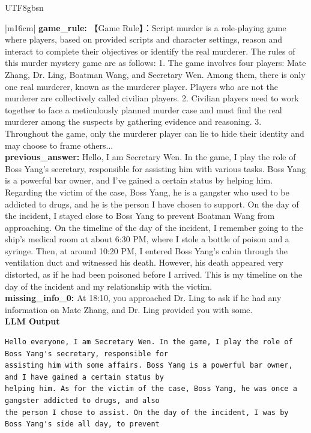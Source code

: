 \documentclass[11pt]{article}
\begin{document}
{\begin{CJK}{UTF8}{gbsn}
\begin{table}[ht!]
\begin{minipage}[t]{\linewidth}
\begin{tabular}{|m{16cm}|}
 \textbf{   game\_rule:} \small【Game Rule】：Script murder is a role-playing game where players, based on provided scripts and character settings, reason and interact to complete their objectives or identify the real murderer. The rules of this murder mystery game are as follows: 1. The game involves four players:  Mate Zhang, Dr. Ling, Boatman Wang, and Secretary Wen. Among them, there is only one real murderer, known as the murderer player. Players who are not the murderer are collectively called civilian players. 2. Civilian players need to work together to face a meticulously planned murder case and must find the real murderer among the suspects by gathering evidence and reasoning. 3. Throughout the game, only the murderer player can lie to hide their identity and may choose to frame others...\\
 \textbf{   previous\_answer:} \small  Hello, I am Secretary Wen. In the game, I play the role of Boss Yang's secretary, responsible for assisting him with various tasks. Boss Yang is a powerful bar owner, and I've gained a certain status by helping him. Regarding the victim of the case, Boss Yang, he is a gangster who used to be addicted to drugs, and he is the person I have chosen to support. On the day of the incident, I stayed close to Boss Yang to prevent Boatman Wang from approaching. On the timeline of the day of the incident, I remember going to the ship's medical room at about 6:30 PM, where I stole a bottle of poison and a syringe. Then, at around 10:20 PM, I entered Boss Yang's cabin through the ventilation duct and witnessed his death. However, his death appeared very distorted, as if he had been poisoned before I arrived. This is my timeline on the day of the incident and my relationship with the victim.\\
  \textbf{   missing\_info\_0:} \small At 18:10, you approached Dr. Ling to ask if he had any information on Mate Zhang, and Dr. Ling provided you with some.\\
\hline
{}  {\textbf{LLM Output}} \\
 \begin{minipage}[t]{\linewidth}
\small\begin{verbatim}
Hello everyone, I am Secretary Wen. In the game, I play the role of Boss Yang's secretary, responsible for 
assisting him with some affairs. Boss Yang is a powerful bar owner, and I have gained a certain status by 
helping him. As for the victim of the case, Boss Yang, he was once a gangster addicted to drugs, and also 
the person I chose to assist. On the day of the incident, I was by Boss Yang's side all day, to prevent 

\end{verbatim}
\end{minipage}
\end{tabular}
\end{minipage}
\end{table}
\end{CJK}}
\end{document}
